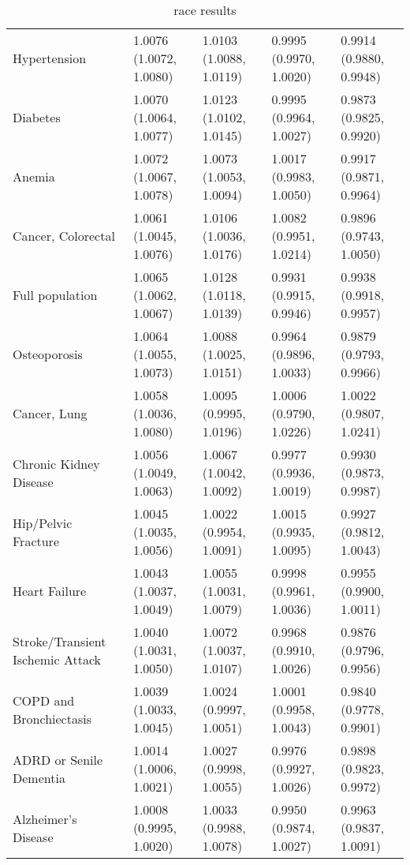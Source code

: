 \begin{table}[ht]
\begin{tabular}{lllll}
  Hypertension & 1.0076 (1.0072, 1.0080) & 1.0103 (1.0088, 1.0119) & 0.9995 (0.9970, 1.0020) & 0.9914 (0.9880, 0.9948) \\ 
  Diabetes & 1.0070 (1.0064, 1.0077) & 1.0123 (1.0102, 1.0145) & 0.9995 (0.9964, 1.0027) & 0.9873 (0.9825, 0.9920) \\ 
  Anemia & 1.0072 (1.0067, 1.0078) & 1.0073 (1.0053, 1.0094) & 1.0017 (0.9983, 1.0050) & 0.9917 (0.9871, 0.9964) \\ 
  Cancer, Colorectal & 1.0061 (1.0045, 1.0076) & 1.0106 (1.0036, 1.0176) & 1.0082 (0.9951, 1.0214) & 0.9896 (0.9743, 1.0050) \\ 
  Full population & 1.0065 (1.0062, 1.0067) & 1.0128 (1.0118, 1.0139) & 0.9931 (0.9915, 0.9946) & 0.9938 (0.9918, 0.9957) \\ 
  Osteoporosis & 1.0064 (1.0055, 1.0073) & 1.0088 (1.0025, 1.0151) & 0.9964 (0.9896, 1.0033) & 0.9879 (0.9793, 0.9966) \\ 
  Cancer, Lung & 1.0058 (1.0036, 1.0080) & 1.0095 (0.9995, 1.0196) & 1.0006 (0.9790, 1.0226) & 1.0022 (0.9807, 1.0241) \\ 
  Chronic Kidney Disease & 1.0056 (1.0049, 1.0063) & 1.0067 (1.0042, 1.0092) & 0.9977 (0.9936, 1.0019) & 0.9930 (0.9873, 0.9987) \\ 
  Hip/Pelvic Fracture & 1.0045 (1.0035, 1.0056) & 1.0022 (0.9954, 1.0091) & 1.0015 (0.9935, 1.0095) & 0.9927 (0.9812, 1.0043) \\ 
  Heart Failure & 1.0043 (1.0037, 1.0049) & 1.0055 (1.0031, 1.0079) & 0.9998 (0.9961, 1.0036) & 0.9955 (0.9900, 1.0011) \\ 
  Stroke/Transient Ischemic Attack & 1.0040 (1.0031, 1.0050) & 1.0072 (1.0037, 1.0107) & 0.9968 (0.9910, 1.0026) & 0.9876 (0.9796, 0.9956) \\ 
  COPD and Bronchiectasis & 1.0039 (1.0033, 1.0045) & 1.0024 (0.9997, 1.0051) & 1.0001 (0.9958, 1.0043) & 0.9840 (0.9778, 0.9901) \\ 
  ADRD or Senile Dementia & 1.0014 (1.0006, 1.0021) & 1.0027 (0.9998, 1.0055) & 0.9976 (0.9927, 1.0026) & 0.9898 (0.9823, 0.9972) \\ 
  Alzheimer's Disease & 1.0008 (0.9995, 1.0020) & 1.0033 (0.9988, 1.0078) & 0.9950 (0.9874, 1.0027) & 0.9963 (0.9837, 1.0091) \\ 
   \hline
\end{tabular}
\caption{race results} 
\label{tab:stratified_OR_table}
\end{table}
